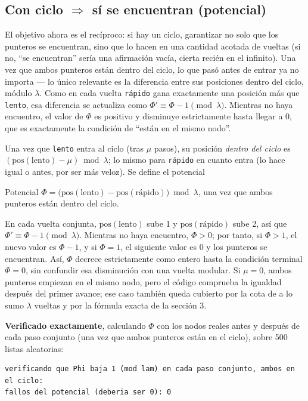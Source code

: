 \documentclass[11pt]{article}
\begin{document}
\subsection*{Con ciclo $\Rightarrow$ sí se encuentran (potencial)}

El objetivo ahora es el recíproco: si hay un ciclo, garantizar no solo que los punteros se encuentran, sino
que lo hacen en una cantidad acotada de vueltas (si no, ``se encuentran'' sería una afirmación vacía, cierta
recién en el infinito). Una vez que ambos punteros están dentro del ciclo, lo que pasó antes de entrar ya no
importa --- lo único relevante es la diferencia entre sus posiciones dentro del ciclo, módulo $\lambda$.
Como en cada vuelta \texttt{rápido} gana exactamente una posición más que \texttt{lento}, esa diferencia se actualiza
como $\Phi'\equiv\Phi-1\pmod\lambda$. Mientras no haya encuentro, el valor de $\Phi$ es positivo y
disminuye estrictamente hasta llegar a 0, que es exactamente la condición de ``están en el mismo nodo''.

Una vez que \texttt{lento} entra al ciclo (tras $\mu$ pasos), su posición \emph{dentro del ciclo} es
$(\mathrm{pos}(\mathrm{lento})-\mu)\bmod\lambda$; lo mismo para \texttt{rápido} en cuanto entra (lo hace
igual o antes, por ser más veloz). Se define el potencial

\begin{resultado}{Potencial}
$\Phi = \big(\mathrm{pos}(\mathrm{lento})-\mathrm{pos}(\text{rápido})\big) \bmod \lambda$, una vez que
ambos punteros están dentro del ciclo.
\end{resultado}

En cada vuelta conjunta, $\mathrm{pos}(\mathrm{lento})$ sube 1 y $\mathrm{pos}(\text{rápido})$ sube 2, así
que $\Phi'\equiv\Phi-1\pmod\lambda$. Mientras no haya encuentro, $\Phi>0$; por tanto, si $\Phi>1$,
el nuevo valor es $\Phi-1$, y si $\Phi=1$, el siguiente valor es 0 y los punteros se encuentran.
Así, $\Phi$ decrece estrictamente como entero hasta la condición terminal $\Phi=0$, sin confundir esa
disminución con una vuelta modular. Si $\mu=0$, ambos punteros empiezan en el mismo nodo, pero el código
comprueba la igualdad después del primer avance; ese caso también queda cubierto por la cota de a lo sumo
$\lambda$ vueltas y por la fórmula exacta de la sección 3.

\textbf{Verificado exactamente}, calculando $\Phi$ con los nodos reales antes y después de cada paso
conjunto (una vez que ambos punteros están en el ciclo), sobre 500 listas aleatorias:
\begin{lstlisting}[style=salida]
verificando que Phi baja 1 (mod lam) en cada paso conjunto, ambos en el ciclo:
fallos del potencial (deberia ser 0): 0
\end{lstlisting}
\end{document}
